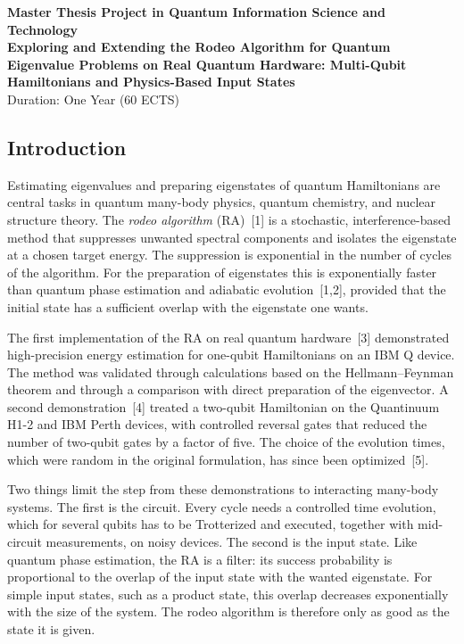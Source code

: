 \documentclass[12pt,a4paper]{article}
\begin{document}
\begin{center}
    {\Large \textbf{Master Thesis Project in Quantum Information Science and Technology}}\\[0.3cm]
    {\large \textbf{Exploring and Extending the Rodeo Algorithm for Quantum Eigenvalue Problems on Real Quantum Hardware: Multi-Qubit Hamiltonians and Physics-Based Input States}}\\[0.2cm]
    \vspace{0.3cm}
    {Duration: One Year (60 ECTS)}
\end{center}

\vspace{1cm}


\subsection*{Introduction}

Estimating eigenvalues and preparing eigenstates of quantum
Hamiltonians are central tasks in quantum many-body physics, quantum
chemistry, and nuclear structure theory.  The \emph{rodeo algorithm}
(RA)~[1] is a stochastic, interference-based method that suppresses
unwanted spectral components and isolates the eigenstate at a chosen
target energy.  The suppression is exponential in the number of cycles
of the algorithm.  For the preparation of eigenstates this is
exponentially faster than quantum phase estimation and adiabatic
evolution~[1,2], provided that the initial state has a sufficient
overlap with the eigenstate one wants.

The first implementation of the RA on real quantum hardware~[3]
demonstrated high-precision energy estimation for one-qubit
Hamiltonians on an IBM Q device.  The method was validated through
calculations based on the Hellmann--Feynman theorem and through a
comparison with direct preparation of the eigenvector.  A second
demonstration~[4] treated a two-qubit Hamiltonian on the Quantinuum
H1-2 and IBM Perth devices, with controlled reversal gates that
reduced the number of two-qubit gates by a factor of five.  The choice
of the evolution times, which were random in the original formulation,
has since been optimized~[5].

Two things limit the step from these demonstrations to interacting
many-body systems.  The first is the circuit.  Every cycle needs a
controlled time evolution, which for several qubits has to be
Trotterized and executed, together with mid-circuit measurements, on
noisy devices.  The second is the input state.  Like quantum phase
estimation, the RA is a filter: its success probability is
proportional to the overlap of the input state with the wanted
eigenstate.  For simple input states, such as a product state, this
overlap decreases exponentially with the size of the system.  The
rodeo algorithm is therefore only as good as the state it is given.
\end{document}
